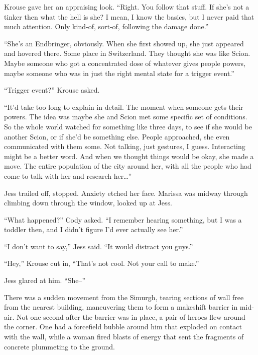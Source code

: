 Krouse gave her an appraising look. ``Right.  You follow that stuff.  If she's not a tinker then what the hell is she?  I mean, I know the basics, but I never paid that much attention.  Only kind-of, sort-of, following the damage done.''



``She's an Endbringer, obviously.  When she first showed up, she just appeared and hovered there.  Some place in Switzerland.  They thought she was like Scion.  Maybe someone who got a concentrated dose of whatever gives people powers, maybe someone who was in just the right mental state for a trigger event.''



``Trigger event?'' Krouse asked.



``It'd take too long to explain in detail.  The moment when someone gets their powers.  The idea was maybe she and Scion met some specific set of conditions.  So the whole world watched for something like three days, to see if she would be another Scion, or if she'd be something else.   People approached, she even communicated with them some.  Not talking, just gestures, I guess.  Interacting might be a better word.  And when we thought things would be okay, she made a move.  The entire population of the city around her, with all the people who had come to talk with her and research her\ldots''



Jess trailed off, stopped.  Anxiety etched her face.  Marissa was midway through climbing down through the window, looked up at Jess.



``What happened?''  Cody asked.  ``I remember hearing something, but I was a toddler then, and I didn't figure I'd ever actually see her.''



``I don't want to say,'' Jess said.  ``It would distract you guys.''



``Hey,'' Krouse cut in, ``That's not cool.  Not your call to make.''



Jess glared at him.  ``She--''



There was a sudden movement from the Simurgh, tearing sections of wall free from the nearest building, maneuvering them to form a makeshift barrier in mid-air.  Not one second after the barrier was in place, a pair of heroes flew around the corner.  One had a forcefield bubble around him that exploded on contact with the wall, while a woman fired blasts of energy that sent the fragments of concrete plummeting to the ground.



